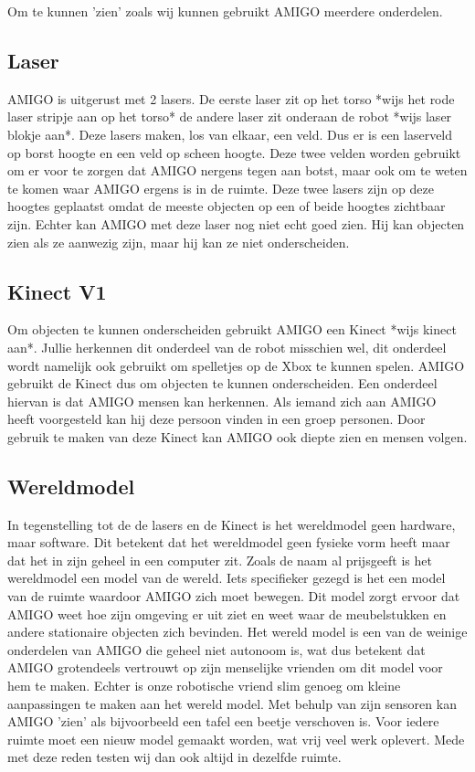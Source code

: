 \documentclass[a4paper,10pt]{article}
\numberwithin{equation}{section}
\numberwithin{figure}{section}
\numberwithin{table}{section}
\begin{document}
Om te kunnen 'zien' zoals wij kunnen gebruikt AMIGO meerdere onderdelen.
\subsection*{Laser}
AMIGO is uitgerust met 2 lasers. De eerste laser zit op het torso *wijs het rode laser stripje aan op het torso* de andere laser zit onderaan de robot *wijs laser blokje aan*. Deze lasers maken, los van elkaar, een veld. Dus er is een laserveld op borst hoogte en een veld op scheen hoogte. Deze twee velden worden gebruikt om er voor te zorgen dat AMIGO nergens tegen aan botst, maar ook om te weten te komen waar AMIGO ergens is in de ruimte. Deze twee lasers zijn op deze hoogtes geplaatst omdat de meeste objecten op een of beide hoogtes zichtbaar zijn. Echter kan AMIGO met deze laser nog niet echt goed zien. Hij kan objecten zien als ze aanwezig zijn, maar hij kan ze niet onderscheiden. 

\subsection*{Kinect V1}
Om objecten te kunnen onderscheiden gebruikt AMIGO een Kinect *wijs kinect aan*. Jullie herkennen dit onderdeel van de robot misschien wel, dit onderdeel wordt namelijk ook gebruikt om spelletjes op de Xbox te kunnen spelen. AMIGO gebruikt de Kinect dus om objecten te kunnen onderscheiden. Een onderdeel hiervan is dat AMIGO mensen kan herkennen. Als iemand zich aan AMIGO heeft voorgesteld kan hij deze persoon vinden in een groep personen. Door gebruik te maken van deze Kinect kan AMIGO ook diepte zien en mensen volgen.

\subsection*{Wereldmodel}
In tegenstelling tot de de lasers en de Kinect is het wereldmodel geen hardware, maar software. Dit betekent dat het wereldmodel geen fysieke vorm heeft maar dat het in zijn geheel in een computer zit. Zoals de naam al prijsgeeft is het wereldmodel een model van de wereld. Iets specifieker gezegd is het een model van de ruimte waardoor AMIGO zich moet bewegen. Dit model zorgt ervoor dat AMIGO weet hoe zijn omgeving er uit ziet en weet waar de meubelstukken en andere stationaire objecten zich bevinden. Het wereld model is een van de weinige onderdelen van AMIGO die geheel niet autonoom is, wat dus betekent dat AMIGO grotendeels vertrouwt op zijn menselijke vrienden om dit model voor hem te maken. Echter is onze robotische vriend slim genoeg om kleine aanpassingen te maken aan het wereld model. Met behulp van zijn sensoren kan AMIGO 'zien' als bijvoorbeeld een tafel een beetje verschoven is. Voor iedere ruimte moet een nieuw model gemaakt worden, wat vrij veel werk oplevert. Mede met deze reden testen wij dan ook altijd in dezelfde ruimte.
\end{document}
